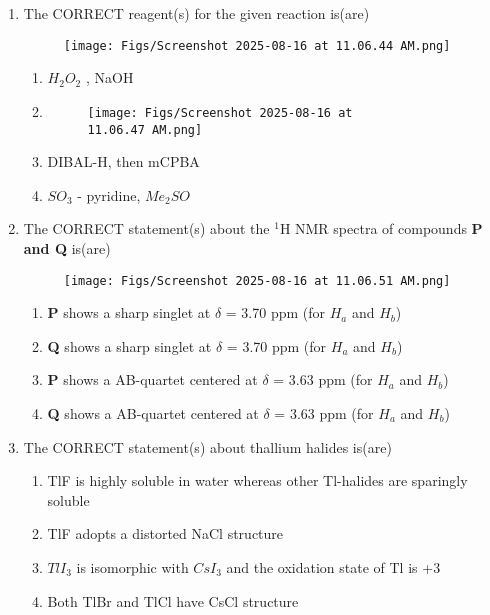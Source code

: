 \documentclass[12pt]{article}
\begin{document}
\begin{enumerate}
\item The CORRECT reagent(s) for the given reaction is(are)

\begin{figure}[H]
\centering
\texttt{[image: Figs/Screenshot 2025-08-16 at 11.06.44 AM.png]}
\caption{}
\end{figure}

\begin{enumerate}
    \item $H_2O_2$ , NaOH
    \item   \begin{figure}[H]
            \centering
            \texttt{[image: Figs/Screenshot 2025-08-16 at 11.06.47 AM.png]}
            \caption{}
            \end{figure}

\item DIBAL-H, then mCPBA
\item $SO_3$ - pyridine, $Me_2SO$


\end{enumerate}

\item The CORRECT statement(s) about the ${^1}$H NMR spectra of compounds \textbf{P and Q}
is(are) \begin{figure}[H]
            \centering
            \texttt{[image: Figs/Screenshot 2025-08-16 at 11.06.51 AM.png]}
            \caption{}
            \end{figure}

\begin{enumerate}
    \item \textbf{P} shows a sharp singlet at $\delta$ = 3.70 ppm (for $H_a$ and $H_b$)
    \item \textbf{Q} shows a sharp singlet at $\delta$ = 3.70 ppm (for $H_a$ and $H_b$)
    \item \textbf{P} shows a AB-quartet centered at $\delta$ = 3.63 ppm (for $H_a$ and $H_b$)
    \item \textbf{Q} shows a AB-quartet centered at $\delta$ = 3.63 ppm (for $H_a$ and $H_b$)

    
\end{enumerate}


\item The CORRECT statement(s) about thallium halides is(are)

\begin{enumerate}
    \item TlF is highly soluble in water whereas other Tl-halides are sparingly soluble
    \item TlF adopts a distorted NaCl structure
    \item $TlI_3$ is isomorphic with $CsI_3$ and the oxidation state of Tl is +3
    \item Both TlBr and TlCl have CsCl structure
    

\end{enumerate}
\end{enumerate}
\end{document}
